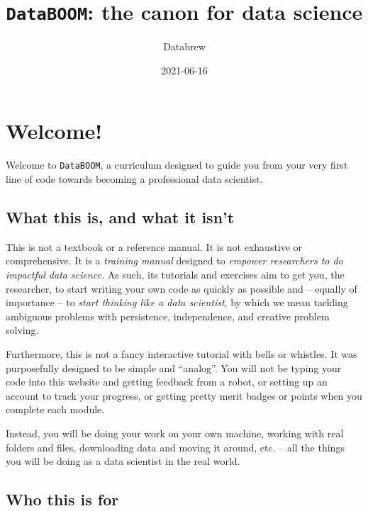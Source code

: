 \documentclass[
]{book}
\title{\texttt{DataBOOM}: the canon for data science}
\author{Databrew}
\date{2021-06-16}
\begin{document}
\maketitle

{
\setcounter{tocdepth}{1}
\tableofcontents
}
\hypertarget{welcome}{%
\chapter{Welcome!}\label{welcome}}

Welcome to \texttt{DataBOOM}, a curriculum designed to guide you from your very first line of code towards becoming a professional data scientist.

\hypertarget{what-this-is-and-what-it-isnt}{%
\section*{What this is, and what it isn't}\label{what-this-is-and-what-it-isnt}}

This is not a textbook or a reference manual. It is not exhaustive or comprehensive. It is a \emph{training manual} designed to \emph{empower researchers to do impactful data science.} As such, its tutorials and exercises aim to get you, the researcher, to start writing your own code as quickly as possible and -- equally of importance -- to \emph{start thinking like a data scientist}, by which we mean tackling ambiguous problems with persistence, independence, and creative problem solving.

Furthermore, this is not a fancy interactive tutorial with bells or whistles. It was purposefully designed to be simple and ``analog''. You will not be typing your code into this website and getting feedback from a robot, or setting up an account to track your progress, or getting pretty merit badges or points when you complete each module.

Instead, you will be doing your work on your own machine, working with real folders and files, downloading data and moving it around, etc. -- all the things you will be doing as a data scientist in the real world.

\hypertarget{who-this-is-for}{%
\section*{Who this is for}\label{who-this-is-for}}
\end{document}
